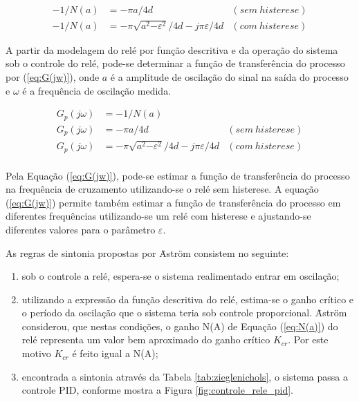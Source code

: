 \begin{equation}
	\label{eq:N(a)}
	\begin{split}
	-1/N(a) 	&=	-{\pi}a/{4d} & (sem~histerese)\\
	-1/N(a) 	&=	-\pi\sqrt{a^2 {-\varepsilon}^2}/{4d} - j\pi\varepsilon/{4d} & (com~histerese)
	\end{split}
\end{equation}	

	A partir da modelagem do relé por função descritiva e da operação do sistema sob o controle do relé, pode-se determinar a função de transferência do processo por (\ref{eq:G(jw)}), onde $a$ é a amplitude de oscilação do sinal na saída do processo e $\omega$ é a frequência de oscilação medida.
	
\begin{equation}
	\label{eq:G(jw)}
	\begin{split}
	G_p(j\omega) 	&=	-{1/{N(a)}} &\\
	G_p(j\omega) 	&=	-{\pi}a/{4d} & (sem~histerese)\\
	G_p(j\omega) 	&=	-\pi\sqrt{a^2 {-\varepsilon}^2}/{4d} - j\pi\varepsilon/{4d} & (com~histerese)\\
	\end{split}
\end{equation}	

	Pela Equação (\ref{eq:G(jw)}), pode-se estimar a função de transferência do processo na frequência de cruzamento utilizando-se o relé sem histerese. A equação (\ref{eq:G(jw)}) permite também estimar a função de transferência do processo em diferentes frequências utilizando-se um relé com histerese e ajustando-se diferentes valores para o parâmetro $\varepsilon$. 
	
	
	As regras de sintonia propostas por \.{A}str\"{o}m consistem no seguinte:
\begin{enumerate}[leftmargin=2cm,label=\alph*)]
	\item sob o controle a relé, espera-se o sistema realimentado entrar em oscilação;
	\item utilizando a expressão da função descritiva do relé, estima-se o ganho crítico e o período da oscilação que o sistema teria sob controle proporcional. \.{A}str\"{o}m considerou, que nestas condições, o ganho N(A) de Equação (\ref{eq:N(a)}) do relé representa um valor bem aproximado do ganho crítico $K_{cr}$. Por este motivo $K_{cr}$ é feito igual a N(A);
	\item encontrada a sintonia através da Tabela \ref{tab:zieglenichols}, o sistema passa a controle PID, conforme mostra a Figura \ref{fig:controle_rele_pid}.
\end{enumerate}


